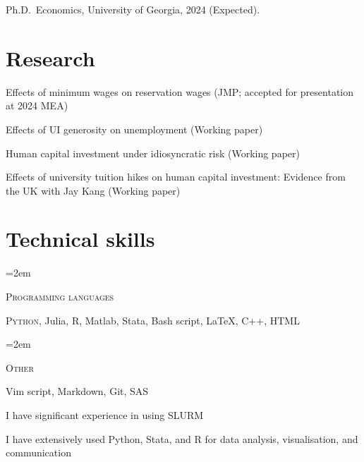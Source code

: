 \documentclass[letterpaper]{article}
\newcommand{\skill}[2]{
  \noindent\hangindent=2em\hangafter=0
  \parbox{3\spacebox}{%
  \textsc{#1}} %
  \hfill
  #2 \par
}%
\newlength{\spacebox}
\renewenvironment{itemize}{
  \begin{list}{}{
    \setlength{\leftmargin}{1.5em}
  }
}{
  \end{list}
}
\begin{document}
\begin{itemize}
  \item Ph.D.\ Economics, University of Georgia, 2024 (Expected).





		
\end{itemize}

\section*{Research}
\begin{itemize}
  \item{Effects of minimum wages on reservation wages}{}{ (JMP; accepted for presentation at 2024 MEA) }
  \item{Effects of UI generosity on unemployment}{}{ (Working paper)}
  \item{Human capital investment under idiosyncratic risk}{}{ (Working paper)}
  \item{Effects of university tuition hikes on human capital investment: Evidence from the UK}{ with Jay Kang}{ (Working paper)}
\end{itemize}

\section*{Technical skills}
\skill{Programming languages}{\textsc{Python}, Julia, R, Matlab, Stata, Bash script, \LaTeX, \textsc{C++}, HTML}
\skill{Other}{Vim script, Markdown, Git, SAS }
\begin{itemize}
  \item I have significant experience in using \textsc{SLURM}
    \item I have extensively used Python, Stata, and R for data analysis, visualisation, and communication
\end{itemize}
\end{document}
